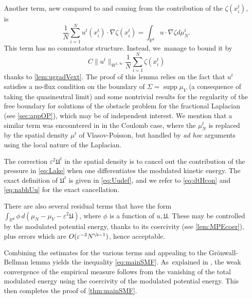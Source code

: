 \documentclass[JEP,XML,SOM,Unicode,published]{cedram}
\theoremstyle{plain}
\theoremstyle{definition}
\DeclareMathOperator{\supp}{supp}
\newcommand{\R}{{\mathbb{R}}}
\let\vep\varepsilon
\let\nab\nabla
\newcommand{\Uu}{\mathfrak{U}}
\renewcommand{\d}{\mathsf{d}}
\newcommand{\s}{\mathsf{s}}
\begin{document}
Another term, new compared to \cite{HkI2021, Rosenzweig2021ne} and coming from the contribution of the $\zeta(x_i^t)$, is\vspace*{-3pt}
\begin{equation*}
\frac1N\sum_{i=1}^N u^t(x_i^t)\cdot\nab\zeta(x_i^t) = \int_{\R^\d} u\cdot\nab\zeta d\mu_N^t.
\end{equation*}
This term has no commutator structure. Instead, we~manage to bound it by\vspace*{-3pt}
\begin{equation*}
C\|u^t\|_{W^{1,\infty}}\frac1N\sum_{i=1}^N \zeta(x_i^t)
\end{equation*}
thanks to \cref{lem:ugradVext}. The proof of this lemma relies on the fact that $u^t$ satisfies a no-flux condition on the boundary of $\Sigma = \supp\mu_V$ (a consequence of taking the quasineutral limit) and some nontrivial results for the regularity of the free boundary for solutions of the obstacle problem for the fractional Laplacian (see \cref{sec:appOP}), which may be of independent interest. We mention that a similar term was encountered in \cite{BCGM2015} in the Coulomb case, where the $\mu_N^t$ is replaced by the spatial density $\mu^t$ of Vlasov-Poisson, but handled by \emph{ad hoc} arguments {using the local nature of the Laplacian}.

The correction $\vep^2\Uu^t$ in the spatial density is to cancel out the contribution of the pressure in \eqref{eq:Lake} when one differentiates the modulated kinetic energy. The exact definition of $\Uu^t$ is given in \eqref{eq:Uudef}, and we refer to \eqref{eq:dtHcon} and \eqref{eq:nabhUu} for the exact cancellation.

There are also several residual terms that have the form $\int_{\R^\d} \phi\, d(\mu_N-\mu_V-\vep^2\Uu)$, where $\phi$ is a function of $u,\Uu$. These may be controlled by the modulated potential energy, thanks to its coercivity (see \cref{lem:MPEcoer}), plus errors which are $O(\vep^{-2}N^{\sfrac{\s}{\d}-1})$, hence acceptable.

Combining the estimates for the various terms and appealing to the Grönwall-Bellman lemma yields the inequality \eqref{eq:mainSMF}. As~explained in {\cite[\S 4.2]{Rosenzweig2021ne}}, the weak convergence of the empirical measure follows from the vanishing of the total modulated energy using the coercivity of the modulated potential energy. This then completes the proof of \cref{thm:mainSMF}.
\end{document}
